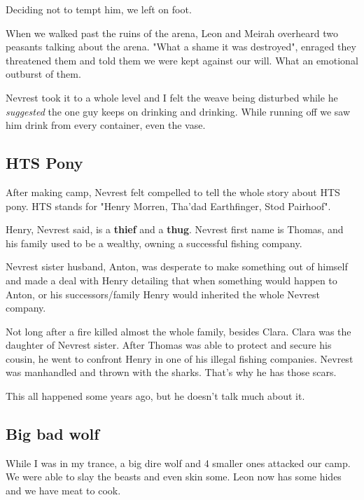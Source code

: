 Deciding not to tempt him, we left on foot.

When we walked past the ruins of the arena, Leon and Meirah overheard two peasants talking about the arena. "What a shame it was destroyed", enraged they threatened them and told them we were kept against our will. What an emotional outburst of them.

Nevrest took it to a whole level and I felt the weave being disturbed while he \textit{suggested} the one guy keeps on drinking and drinking. While running off we saw him drink from every container, even the vase.

\subsection*{HTS Pony}
After making camp, Nevrest felt compelled to tell the whole story about HTS pony. HTS stands for "Henry Morren, Tha'dad Earthfinger, Stod Pairhoof".

Henry, Nevrest said, is a \textbf{thief} and a \textbf{thug}. Nevrest first name is Thomas, and his family used to be a wealthy, owning a successful fishing company.

Nevrest sister husband, Anton, was desperate to make something out of himself and made a deal with Henry detailing that when something would happen to Anton, or his successors/family Henry would inherited the whole Nevrest company.

Not long after a fire killed almost the whole family, besides Clara. Clara was the daughter of Nevrest sister. After Thomas was able to protect and secure his cousin, he went to confront Henry in one of his illegal fishing companies. Nevrest was manhandled and thrown with the sharks. That's why he has those scars.

This all happened some years ago, but he doesn't talk much about it.

\subsection*{Big bad wolf}
While I was in my trance, a big dire wolf and 4 smaller ones attacked our camp. We were able to slay the beasts and even skin some. Leon now has some hides and we have meat to cook.
